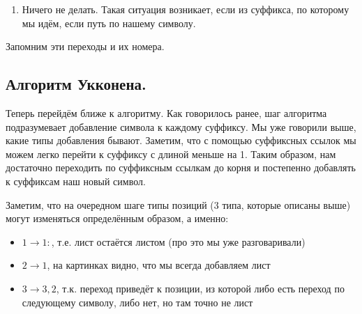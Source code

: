 \begin{enumerate}
\begin{itemize}
\begin{figure}[H]
\begin{center}
        \end{center}
      \end{figure}
    \end{itemize}
  \item Ничего не делать. Такая ситуация возникает, если из суффикса, по которому мы идём, если путь
        по нашему символу.
\end{enumerate}

Запомним эти переходы и их номера.

\subsection{Алгоритм Укконена.}
Теперь перейдём ближе к алгоритму. Как говорилось ранее, шаг алгоритма подразумевает
добавление символа к каждому суффиксу. Мы уже говорили выше, какие типы добавления бывают.
Заметим, что с помощью суффиксных ссылок мы можем легко перейти к суффиксу с длиной меньше на 1.
Таким образом, нам достаточно переходить по суффиксным ссылкам до корня и постепенно добавлять
к суффиксам наш новый символ.

Заметим, что на очередном шаге типы позиций (3 типа, которые описаны выше) могут изменяться определённым образом, а именно:
\begin{itemize}
  \item $1 \to 1 \colon$, т.е. лист остаётся листом (про это мы уже разговаривали)
  \item $2 \to  1$, на картинках видно, что мы всегда добавляем лист
  \item $3 \to  3, 2$, т.к. переход приведёт к позиции, из которой либо есть переход по следующему символу, либо нет, но там точно не лист
\end{itemize}

